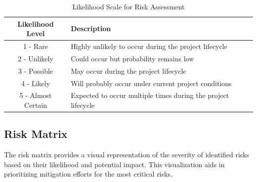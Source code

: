 \begin{table}[H]
    \centering
    \renewcommand{\arraystretch}{1.5}
    \begin{tabular}{|c|p{12cm}|}
    \hline
    \textbf{Likelihood Level} & \textbf{Description} \\
    \hline
    1 - Rare & Highly unlikely to occur during the project lifecycle \\
    \hline
    2 - Unlikely & Could occur but probability remains low \\
    \hline
    3 - Possible & May occur during the project lifecycle \\
    \hline
    4 - Likely & Will probably occur under current project conditions \\
    \hline
    5 - Almost Certain & Expected to occur multiple times during the project lifecycle \\
    \hline
    \end{tabular}
    \caption{Likelihood Scale for Risk Assessment}
    \label{tab:likelihood_scale}
\end{table}

\subsection{Risk Matrix}
The risk matrix provides a visual representation of the severity of identified risks based on their likelihood and potential impact. This visualization aids in prioritizing mitigation efforts for the most critical risks.

